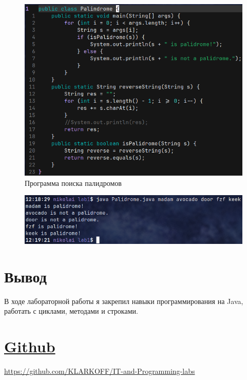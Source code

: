 \documentclass[a4paper, 17pt]{extarticle}
\begin{document}
\begin{figure}[h]
  \centering
  \includegraphics[width=.6\textwidth]{palidrome.png}
  \caption{Программа поиска палидромов}
\end{figure}
\begin{figure}[h]
  \centering
  \includegraphics[width=.6\textwidth]{palidrome_output.png}
  \caption{}
\end{figure}

\pagebreak
\section{Вывод}
В ходе лабораторной работы я закрепил навыки программирования на Java, работать
с циклами, методами и строками.

\section{\href{https://github.com/KLARKOFF/IT-and-Programming-labs}{Github}}
\href{https://github.com/KLARKOFF/IT-and-Programming-labs}{https://github.com/KLARKOFF/IT-and-Programming-labs}
\end{document}

